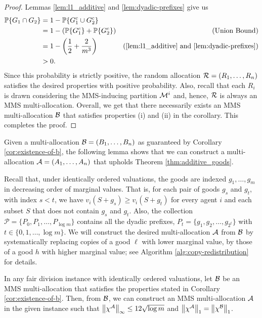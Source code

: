 \begin{proof} 
Lemmas \ref{lem:l1_additive} and \ref{lem:dyadic-prefixes} give us 
\begin{align*} \displaystyle \mathbb{P}\{G_1 \cap G_2\} & = 1 - \mathbb{P}\{G_1^c \cup G_2^c\} \\ 
& = 1 - \left(\mathbb{P}\{G_1^c\}+ \mathbb{P}\{G_2^c\}\right) & (\text{Union Bound})\\ 
& = 1 - \left(\frac{1}{2} + \frac{2}{m^3}\right) & (\text{\Cref{lem:l1_additive} and \ref{lem:dyadic-prefixes}}) \\ 
& > 0.
\end{align*} 
Since this probability is strictly positive, the random allocation $\mathcal{R}=(R_1, \ldots, R_n)$ satisfies the desired properties with positive probability. Also, recall that each $R_i$ is drawn considering the MMS-inducing partition $\mathcal{M}^i$ and, hence, $\mathcal{R}$ is always an MMS multi-allocation. Overall, we get that there necessarily exists an MMS multi-allocation $\mathcal{B}$ that satisfies properties (i) and (ii) in the corollary. This completes the proof. 
\end{proof}


Given a multi-allocation $\mathcal{B}=(B_1,\ldots,B_n)$ as guaranteed by Corollary \ref{cor:existence-of-b}, the following lemma shows that we can construct a multi-allocation $\mathcal{A}=(A_1,\ldots,A_n)$ that upholds Theorem \ref{thm:additive_goods}.

Recall that, under identically ordered valuations, the goods are indexed $g_1, \ldots, g_m$ in decreasing order of marginal values. That is,  for each pair of goods $g_s$ and $g_t$, with index $s<t$, we have $v_i(S + g_s) \geq v_i(S + g_t)$ for every agent $i$ and each subset $S$ that does not contain $g_s$ and $g_t$. Also, the collection $\mathcal{P}=\{P_0,P_1,\dots,P_{\log m}\}$ contains all the dyadic prefixes, $P_t=\{g_1,g_2,\ldots,g_{2^t}\}$ with $t\in\{0,1,\dots,\log m\}$. We will construct the desired multi-allocation $\mathcal{A}$ from $\mathcal{B}$ by systematically replacing copies of a good $\ell$ with lower marginal value, by those of a good $h$ with higher marginal value; see Algorithm \ref{alg:copy-redistribution} for details.
    
\begin{lemma}\label{lem:copy-redistribution}
        In any fair division instance with identically ordered valuations, let $\mathcal{B}$ be an MMS multi-allocation that satisfies the properties stated in Corollary \ref{cor:existence-of-b}. Then, from $\mathcal{B}$, we can construct an MMS multi-allocation $\mathcal{A}$ in the given instance such that $\left\|\chi^{\mathcal{A}}\right\|_\infty \leq 12 \sqrt{\log m}$ and $\left\|\chi^{\mathcal{A}}\right\|_1=\left\|\chi^{\mathcal{B}}\right\|_1$.
\end{lemma}



